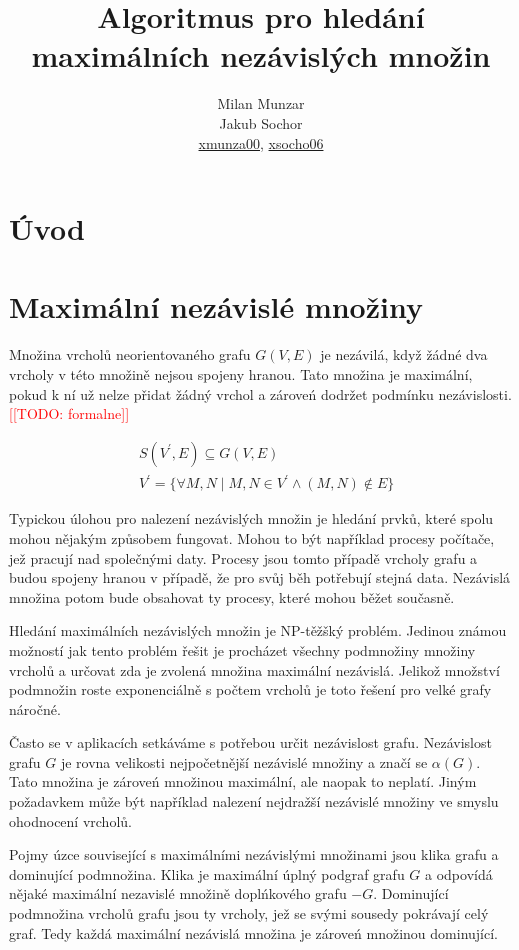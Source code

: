 \documentclass[12pt]{article}
\title{Algoritmus pro hledání maximálních nezávislých množin}
\author{Milan Munzar\\
Jakub Sochor\\
\normalsize{\url{xmunza00}, \url{xsocho06} }}
\date{}
\newcommand{\todo}[1]{\textcolor{red}{[[TODO: #1]]}}
\begin{document}
\maketitle

\section{Úvod}



\section{Maximální nezávislé množiny}

Množina vrcholů neorientovaného grafu \(G(V,E)\) je nezávilá, když žádné dva vrcholy v této množině nejsou spojeny hranou. Tato množina je maximální, pokud k ní už nelze přidat žádný vrchol a zároveń dodržet podmínku nezávislosti. \todo{formalne}

\begin{align*}
&S(V^{'}, E) \subseteq G(V, E) \\
&V^{'} = \{\forall M,N \mid M,N \in V^{'} \land (M,N) \notin E \}
\end{align*}

Typickou úlohou pro nalezení nezávislých množin je hledání prvků, které spolu mohou nějakým způsobem fungovat. Mohou to být například procesy počítače, jež pracují nad společnými daty. Procesy jsou tomto případě vrcholy grafu a budou spojeny hranou v případě, že pro svůj běh potřebují stejná data. Nezávislá množina potom bude obsahovat ty procesy, které mohou běžet současně.

Hledání maximálních nezávislých množin je NP-těžšký problém. Jedinou známou možností jak tento problém řešit je procházet všechny podmnožiny množiny vrcholů a určovat zda je zvolená množina maximální nezávislá. Jelikož množství podmnožin roste exponenciálně s počtem vrcholů je toto řešení pro velké grafy náročné.

Často se v aplikacích  setkáváme s potřebou určit nezávislost grafu. Nezávislost grafu \(G\) je rovna velikosti nejpočetnější nezávislé množiny a značí se \(\alpha(G)\). Tato množina je zároveń množinou maximální, ale naopak to neplatí. Jiným požadavkem může být například nalezení nejdražší nezávislé množiny ve smyslu ohodnocení vrcholů.

Pojmy úzce související s maximálními nezávislými množinami jsou klika grafu a dominující podmnožina. Klika je maximální úplný podgraf grafu \(G\) a odpovídá nějaké maximální nezavislé množině doplńkového grafu \(-G\). Dominující podmnožina vrcholů grafu jsou ty vrcholy, jež se svými sousedy pokrávají celý graf. Tedy každá maximální nezávislá množina je zároveń množinou dominující.
\end{document}
